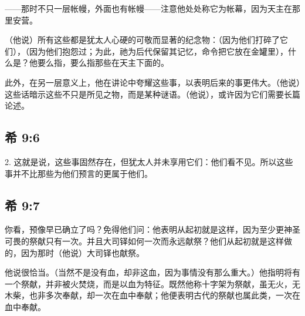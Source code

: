 ——那时不只一层帐幔，外面也有帐幔——注意他处处称它为帐幕，因为天主在那里安营。\par

（他说）所有这些都是犹太人心硬的可敬而显著的纪念物：（因为他们打碎了它们），（因为他们抱怨过；为此，祂为后代保留其记忆，命令把它放在金罐里），什么是？他要么指，要么指那些在天主下面的。\par

此外，在另一层意义上，他在讲论中夸耀这些事，以表明后来的事更伟大。（他说）这些话暗示这些不只是所见之物，而是某种谜语。（他说），或许因为它们需要长篇论述。\par


\subsection{希 9:6}

2. 这就是说，这些事固然存在，但犹太人并未享用它们：他们看不见。所以这些事并不比那些为他们预言的更属于他们。\par


\subsection{希 9:7}

你看，预像早已确立了吗？免得他们问：他表明从起初就是这样，因为至少更神圣可畏的祭献只有一次。并且大司铎如何一次而永远献祭？他们从起初就是这样做的，因为那时（他说）大司铎也献祭。\par

他说很恰当。（当然不是没有血，却非这血，因为事情没有那么重大。）他指明将有一个祭献，并非被火焚烧，而是以血为特征。既然他称十字架为祭献，虽无火，无木柴，也非多次奉献，却一次在血中奉献；他便表明古代的祭献也属此类，一次在血中奉献。\par

